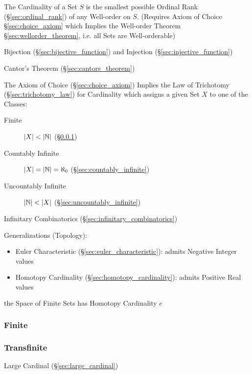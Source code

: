 The Cardinality of a Set $S$ is the smallest possible Ordinal Rank
(\S\ref{sec:ordinal_rank}) of any Well-order on $S$. (Requires Axiom
of Choice \S\ref{sec:choice_axiom} which Implies the Well-order
Theorem \S\ref{sec:wellorder_theorem}, i.e. all Sets are
Well-orderable)

Bijection (\S\ref{sec:bijective_function}) and Injection
(\S\ref{sec:injective_function})

Cantor's Theorem (\S\ref{sec:cantors_theorem})

The Axiom of Choice (\S\ref{sec:choice_axiom}) Implies the Law of
Trichotomy (\S\ref{sec:trichotomy_law}) for Cardinality which assigns
a given Set $X$ to one of the Classes:

\begin{description}
\item [Finite] $|X| < |\mathbb{N}|$ (\S\ref{sec:finite_cardinality})
\item [Countably Infinite] $|X| = |\mathbb{N}| = \aleph_0$
  (\S\ref{sec:countably_infinite})
\item [Uncountably Infinite] $|\mathbb{N}| < |X|$
  (\S\ref{sec:uncountably_infinite})
\end{description}

Infinitary Combinatorics (\S\ref{sec:infinitary_combinatorics})


\asterism


Generalizations (Topology):

\begin{itemize}
  \item Euler Characteristic (\S\ref{sec:euler_characteristic}):
    admits Negative Integer values
  \item Homotopy Cardinality (\S\ref{sec:homotopy_cardinality}):
    admits Positive Real values
\end{itemize}

the Space of Finite Sets has Homotopy Cardinality $e$



\subsubsection{Finite}\label{sec:finite_cardinality}

\subsubsection{Transfinite}\label{sec:transfinite}

Large Cardinal (\S\ref{sec:large_cardinal})

